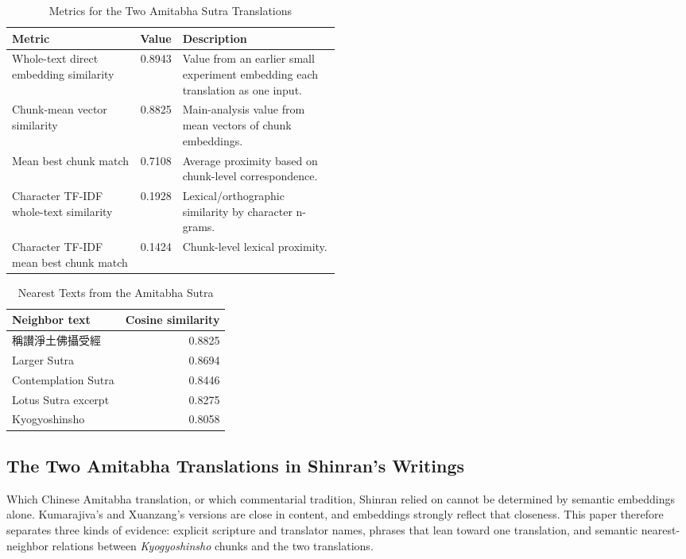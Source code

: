 \documentclass[uplatex,dvipdfmx,11pt,a4paper]{jsarticle}
\begin{document}
\begin{table}[H]
\centering
\small
\caption{Metrics for the Two Amitabha Sutra Translations}
\label{tab:amida-metric-consistency}
\begin{tabular}{lrp{0.48\linewidth}}
\toprule
Metric & Value & Description \\
\midrule
Whole-text direct embedding similarity & 0.8943 & Value from an earlier small experiment embedding each translation as one input. \\
Chunk-mean vector similarity & 0.8825 & Main-analysis value from mean vectors of chunk embeddings. \\
Mean best chunk match & 0.7108 & Average proximity based on chunk-level correspondence. \\
Character TF-IDF whole-text similarity & 0.1928 & Lexical/orthographic similarity by character n-grams. \\
Character TF-IDF mean best chunk match & 0.1424 & Chunk-level lexical proximity. \\
\bottomrule
\end{tabular}
\end{table}

\begin{table}[H]
\centering
\caption{Nearest Texts from the Amitabha Sutra}
\begin{tabular}{lr}
\toprule
Neighbor text & Cosine similarity \\
\midrule
稱讃淨土佛攝受經 & 0.8825 \\
Larger Sutra & 0.8694 \\
Contemplation Sutra & 0.8446 \\
Lotus Sutra excerpt & 0.8275 \\
Kyogyoshinsho & 0.8058 \\
\bottomrule
\end{tabular}
\end{table}

\subsection{The Two Amitabha Translations in Shinran's Writings}

Which Chinese Amitabha translation, or which commentarial tradition, Shinran relied on cannot be determined by semantic embeddings alone. Kumarajiva's and Xuanzang's versions are close in content, and embeddings strongly reflect that closeness. This paper therefore separates three kinds of evidence: explicit scripture and translator names, phrases that lean toward one translation, and semantic nearest-neighbor relations between \textit{Kyogyoshinsho} chunks and the two translations.
\end{document}
